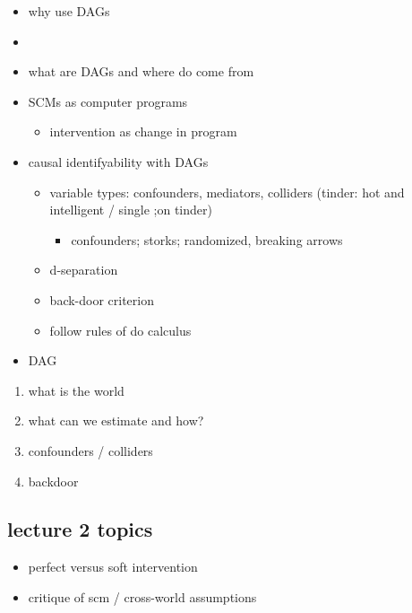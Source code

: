 \documentclass[
  letterpaper,
  DIV=11,
  numbers=noendperiod]{scrartcl}
\providecommand{\tightlist}{%
  \setlength{\itemsep}{0pt}\setlength{\parskip}{0pt}}\usepackage{longtable,booktabs,array}
\begin{document}
\begin{itemize}
\tightlist
\item
  why use DAGs
\item
\item
  what are DAGs and where do come from
\item
  SCMs as computer programs

  \begin{itemize}
  \tightlist
  \item
    intervention as change in program
  \end{itemize}
\item
  causal identifyability with DAGs

  \begin{itemize}
  \tightlist
  \item
    variable types: confounders, mediators, colliders (tinder: hot and
    intelligent / single ;on tinder)

    \begin{itemize}
    \tightlist
    \item
      confounders; storks; randomized, breaking arrows
    \end{itemize}
  \item
    d-separation
  \item
    back-door criterion
  \item
    follow rules of do calculus
  \end{itemize}
\item
  DAG
\end{itemize}

\begin{enumerate}
\def\labelenumi{\arabic{enumi}.}
\tightlist
\item
  what is the world
\item
  what can we estimate and how?
\item
  confounders / colliders
\item
  backdoor
\end{enumerate}

\subsection{lecture 2 topics}\label{lecture-2-topics}

\begin{itemize}
\tightlist
\item
  perfect versus soft intervention
\item
  critique of scm / cross-world assumptions
\end{itemize}
\end{document}
